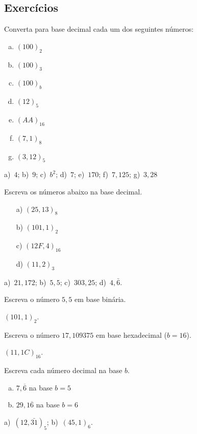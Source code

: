 \subsection*{Exercícios}

\indent
\begin{exer} Converta para base decimal cada um dos seguintes números:
    \begin{enumerate}[a)]
    \item $(100)_2$
    \item $(100)_3$
    \item $(100)_b$
    \item $(12)_5$
    \item $(AA)_{16}$
    \item $(7,1)_8$
    \item $(3,12)_5$
    \end{enumerate}
\end{exer}
\begin{resp}
   a)~$4$; b)~$9$; c)~$b^2$; d)~$7$; e)~$170$; f)~$7,125$; g)~$3,28$
\end{resp}

\begin{exer}Escreva os números abaixo na base decimal.
  \begin{enumerate}[a)]
  \item[a)] $(25,13)_8$
  \item[b)] $(101,1)_2$
  \item[c)] $(12F,4)_{16}$
  \item[d)] $(11,2)_{3}$
  \end{enumerate}
\end{exer}
\begin{resp}
  a)~$21,172$; b)~$5,5$; c)~$303,25$; d)~$4,\bar{6}$.
\end{resp}

\begin{exer}
  Escreva o número $5,5$ em base binária.
\end{exer}
\begin{resp}
    $(101,1)_2$.
\end{resp}

\begin{exer}
  Escreva o número $17,109375$ em base hexadecimal ($b=16$).
\end{exer}
\begin{resp} $(11,1C)_{16}$.
\end{resp}

\begin{exer} Escreva cada número decimal na base $b$.
  \begin{enumerate}[a)]
  \item $7,\overline{6}$ na base $b=5$
  \item $29,1\overline{6}$ na base $b=6$
  \end{enumerate}
\end{exer}
\begin{resp}
  a)~$(12,\bar{31})_5$; b)~$(45,1)_6$.
\end{resp}


